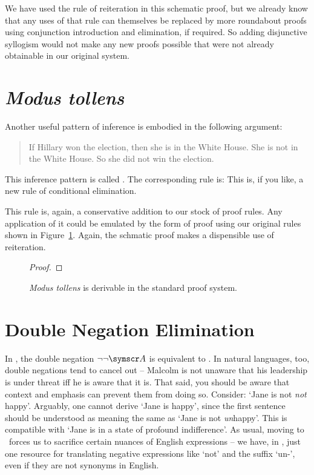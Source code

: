 We have used the rule of reiteration in this schematic proof, but we already know that any uses of that rule can themselves be replaced by more roundabout proofs using conjunction introduction and elimination, if required. So adding disjunctive syllogism would not make any new proofs possible that were not already obtainable in our original system.

\section{\emph{Modus tollens}}
Another useful pattern of inference is embodied in the following argument:
	\begin{quote}
		If Hillary won the election, then she is in the White House. She is not in the White House. So she did not win the election.
	\end{quote}
This inference pattern is called . The corresponding rule is:
This is, if you like, a new rule of conditional elimination.

This rule is, again, a conservative addition to our stock of proof rules. Any application of it could be emulated by the form of proof using our original rules shown in Figure~\ref{fig.mtder}. Again, the schmatic proof makes a dispensible use of reiteration.
\begin{figure}
	\begin{proof}
	\have[\ ]{}{\vdots}
		\open
		\close
\end{proof}
\caption{\emph{Modus tollens} is derivable in the standard proof system.\label{fig.mtder}}
\end{figure}



\section{Double Negation Elimination}

In \TFL, the double negation $\enot\enot\meta{A}$ is equivalent to . In natural languages, too, double negations tend to cancel out – Malcolm is not unaware that his leadership is under threat iff he is aware that it is. That said, you should be aware that context and emphasis can prevent them from doing so. Consider: `Jane is not \emph{not} happy'. Arguably, one cannot derive `Jane is happy', since the first sentence should be understood as meaning the same as  `Jane is not \emph{un}happy'. This is compatible with `Jane is in a state of profound indifference'. As usual, moving to \TFL\ forces us to sacrifice certain nuances of English expressions – we have, in \TFL, just one resource for translating negative expressions like `not' and the suffix `un-', even if they are not synonyms in English.

